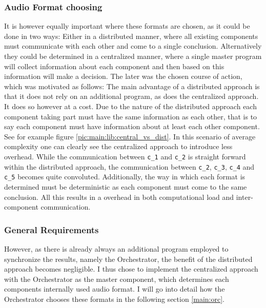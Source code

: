 \subsubsection{Audio Format choosing}
\label{main:lib:format_chooosing}
It is however equally important where these formats are chosen, as it could be done in two ways:
Either in a distributed manner, where all existing components must communicate with each other and come to a single conclusion.
Alternatively they could be determined in a centralized manner, where a single master program will collect information about each component and then based on this information will make a decision.
The later was the chosen course of action, which was motivated as follows:
The main advantage of a distributed approach is that it does not rely on an additional program, as does the centralized approach.
It does so however at a cost. 
Due to the nature of the distributed approach each component taking part must have the same information as each other, that is to say each component must have information about at least each other component.
See for example figure \ref{pic:main:lib:central_vs_dist}.
In this scenario of average complexity one can clearly see the centralized approach to introduce less overhead.
While the communication between \texttt{c\_1} and \texttt{c\_2} is straight forward within the distributed approach, the communication between \texttt{c\_2}, \texttt{c\_3}, \texttt{c\_4} and \texttt{c\_5} becomes quite convoluted.
Additionally, the way in which each format is determined must be deterministic as each component must come to the same conclusion.
All this results in a overhead in both computational load and inter-component communication.

\subsubsection{General Requirements}
However, as there is already always an additional program  employed to synchronize the results, namely the Orchestrator, the benefit of the distributed approach becomes negligible.
I thus chose to implement the centralized approach with the Orchestrator as the master component, which determines each components internally used audio format.
I will go into detail how the Orchestrator chooses these formats in the following section \ref{main:orc}.

